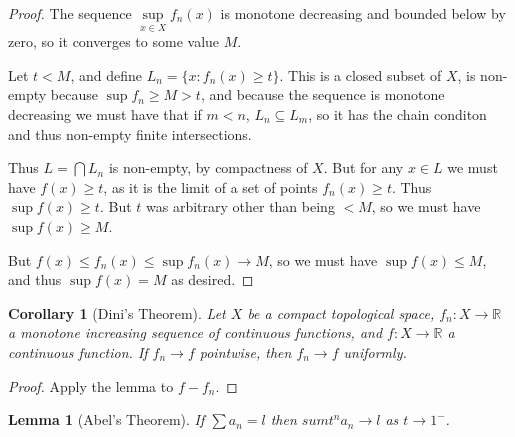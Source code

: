 \documentclass[a4paper]{book}
\newtheorem{lemma}{Lemma}[section]
\newtheorem{corollary}{Corollary}[section]
\begin{document}
\begin{proof}
The sequence \(\sup\limits_{x \in X} f_n(x)\) is monotone decreasing and bounded below by zero,
so it converges to some value \(M\).

Let \(t < M\),
and define \(L_n = \{x: f_n(x) \geq t\}\).
This is a closed subset of \(X\),
is non-empty because \(\sup f_n \geq M > t\),
and because the sequence is monotone decreasing we must have that if \(m < n\),
\(L_n \subseteq L_m\),
so it has the chain conditon and thus non-empty finite intersections.

Thus \(L = \bigcap L_n\) is non-empty,
by compactness of \(X\).
But for any \(x \in L\) we must have \(f(x) \geq t\),
as it is the limit of a set of points \(f_n(x) \geq t\).
Thus \(\sup f(x) \geq t\).
But \(t\) was arbitrary other than being \(< M\),
so we must have \(\sup f(x) \geq M\). 

But \(f(x) \leq f_n(x) \leq \sup f_n(x) \to M\),
so we must have \(\sup f(x) \leq M\),
and thus \(\sup f(x) = M\) as desired.
\end{proof}

\begin{corollary}[Dini's Theorem]
Let \(X\) be a compact topological space,
\(f_n: X \to \mathbb{R}\) a monotone increasing sequence of continuous functions,
and \(f: X \to \mathbb{R}\) a continuous function.
If \(f_n \to f\) pointwise,
then \(f_n \to f\) uniformly.
\end{corollary}

\begin{proof}
Apply the lemma to \(f - f_n\).
\end{proof}

\begin{lemma}[Abel's Theorem]
If \(\sum a_n = l\) then \(sum t^n a_n \to l\) as \(t \to 1^-\).
\end{lemma}
\end{document}
